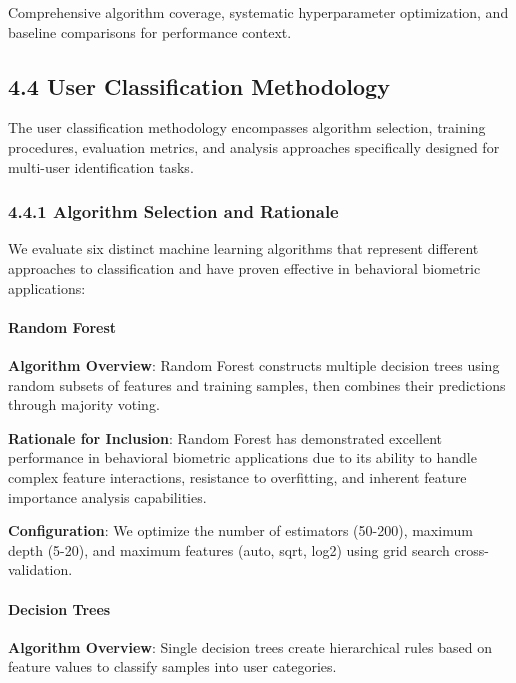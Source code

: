 \documentclass[
  11pt,
  a4paper,
]{article}
\begin{document}
Comprehensive algorithm coverage, systematic hyperparameter
optimization, and baseline comparisons for performance context.

\subsection{4.4 User Classification
Methodology}\label{user-classification-methodology}

The user classification methodology encompasses algorithm selection,
training procedures, evaluation metrics, and analysis approaches
specifically designed for multi-user identification tasks.

\subsubsection{4.4.1 Algorithm Selection and
Rationale}\label{algorithm-selection-and-rationale}

We evaluate six distinct machine learning algorithms that represent
different approaches to classification and have proven effective in
behavioral biometric applications:

\paragraph{Random Forest}\label{random-forest}

\textbf{Algorithm Overview}: Random Forest constructs multiple decision
trees using random subsets of features and training samples, then
combines their predictions through majority voting.

\textbf{Rationale for Inclusion}: Random Forest has demonstrated
excellent performance in behavioral biometric applications due to its
ability to handle complex feature interactions, resistance to
overfitting, and inherent feature importance analysis capabilities.

\textbf{Configuration}: We optimize the number of estimators (50-200),
maximum depth (5-20), and maximum features (auto, sqrt, log2) using grid
search cross-validation.

\paragraph{Decision Trees}\label{decision-trees}

\textbf{Algorithm Overview}: Single decision trees create hierarchical
rules based on feature values to classify samples into user categories.
\end{document}
